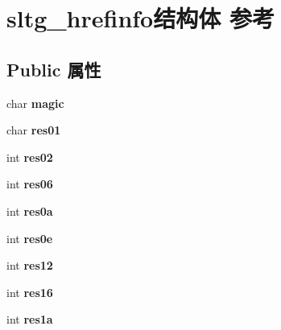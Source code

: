 \hypertarget{structsltg__hrefinfo}{}\section{sltg\+\_\+hrefinfo结构体 参考}
\label{structsltg__hrefinfo}
\subsection*{Public 属性}
\begin{DoxyCompactItemize}
\item 
\mbox{\label{structsltg__hrefinfo_aa0fec3d412388bd8f4529b745bdf94f6}} 
char {\bfseries magic}
\item 
\mbox{\label{structsltg__hrefinfo_a94fa90771d2125ec5f9a30d76a61f086}} 
char {\bfseries res01}
\item 
\mbox{\label{structsltg__hrefinfo_a9d67c4bd6c4cf978690a2fcdf3092739}} 
int {\bfseries res02}
\item 
\mbox{\label{structsltg__hrefinfo_a5e3c356209ff3a97f60b69d45bd6da58}} 
int {\bfseries res06}
\item 
\mbox{\label{structsltg__hrefinfo_a633748a32b48870d13f73a764a8fd558}} 
int {\bfseries res0a}
\item 
\mbox{\label{structsltg__hrefinfo_a07f9cb36fba67a6fcec88556b73fad04}} 
int {\bfseries res0e}
\item 
\mbox{\label{structsltg__hrefinfo_a27ccba98765942c82f9408e2cd5b2034}} 
int {\bfseries res12}
\item 
\mbox{\label{structsltg__hrefinfo_a44da458702354d2be853c1dd7dabd440}} 
int {\bfseries res16}
\item 
\mbox{\label{structsltg__hrefinfo_aae84d9a2f12b4bbb6c4da19d8459f05b}} 
int {\bfseries res1a}
\item 
\mbox{\label{structsltg__hrefinfo_ac9533282b1b081b81cfbf589151ef545}} 

\end{DoxyCompactItemize}
